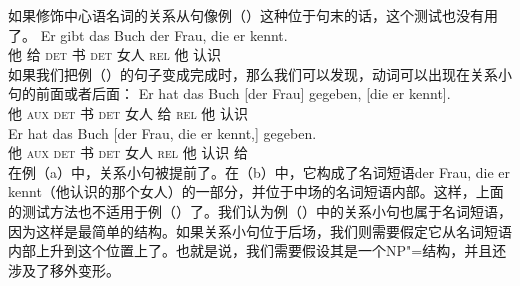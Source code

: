 \noindent
如果修饰中心语名词的关系从句像例（）这种位于句末的话，这个测试也没有用了。
\ea
\gll Er gibt das Buch der Frau, die er kennt.\\
      他 给 \textsc{det} 书 \textsc{det} 女人 \textsc{rel} 他 认识\\
\z
如果我们把例（）的句子变成完成时，那么我们可以发现，动词可以出现在关系小句的前面或者后面：
\eal
\ex 
\gll Er hat das Buch [der Frau] gegeben, [die er kennt].\\
     他 \textsc{aux} \textsc{det} 书 \spacebr{}\textsc{det} 女人 给 \spacebr{}\textsc{rel} 他 认识\\
\ex 
\gll Er hat das Buch [der Frau, die er kennt,] gegeben.\\
	 他 \textsc{aux} \textsc{det} 书 \spacebr{}\textsc{det} 女人 \textsc{rel} 他 认识 给\\
\zl
在例（a）中，关系小句被提前了。在（b）中，它构成了名词短语der Frau, die er kennt（他认识的那个女人）的一部分，并位于中场的名词短语内部。这样，上面的测试方法也不适用于例（）了。我们认为例（）中的关系小句也属于名词短语，因为这样是最简单的结构。如果关系小句位于后场，我们则需要假定它从名词短语内部上升到这个位置上了。也就是说，我们需要假设其是一个NP"=结构，并且还涉及了移外变形。
%
